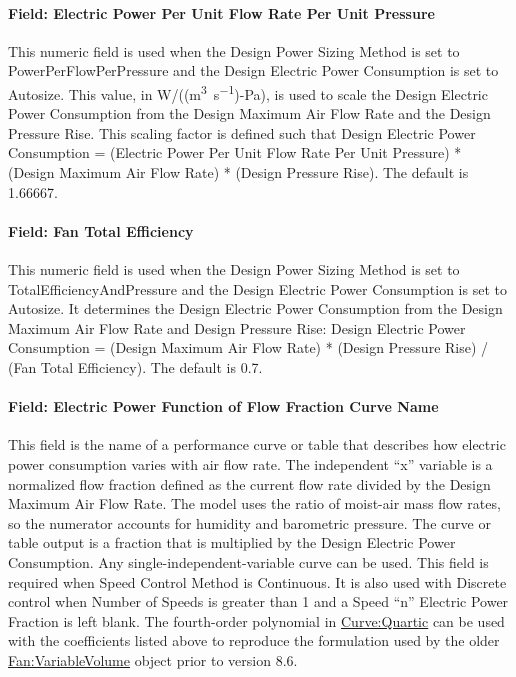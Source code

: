 \paragraph{Field: Electric Power Per Unit Flow Rate Per Unit Pressure}\label{field-power-per-flow-per-pressure-fansysmodel}

This numeric field is used when the Design Power Sizing Method is set to PowerPerFlowPerPressure and the Design Electric Power Consumption is set to Autosize. This value, in W/((\si{\m\cubed\per\s})-Pa), is used to scale the Design Electric Power Consumption from the Design Maximum Air Flow Rate and the Design Pressure Rise. This scaling factor is defined such that Design Electric Power Consumption = (Electric Power Per Unit Flow Rate Per Unit Pressure) * (Design Maximum Air Flow Rate) * (Design Pressure Rise).  The default is 1.66667.

\paragraph{Field: Fan Total Efficiency}\label{field-total-efficiency-fansysmodel}

This numeric field is used when the Design Power Sizing Method is set to TotalEfficiencyAndPressure and the Design Electric Power Consumption is set to Autosize. It determines the Design Electric Power Consumption from the Design Maximum Air Flow Rate and Design Pressure Rise: Design Electric Power Consumption = (Design Maximum Air Flow Rate) * (Design Pressure Rise) / (Fan Total Efficiency). The default is 0.7.

\paragraph{Field: Electric Power Function of Flow Fraction Curve Name}\label{field-power-curve-name-fansysmodel}

This field is the name of a performance curve or table that describes how electric power consumption varies with air flow rate. The independent ``x'' variable is a normalized flow fraction defined as the current flow rate divided by the Design Maximum Air Flow Rate. The model uses the ratio of moist-air mass flow rates, so the numerator accounts for humidity and barometric pressure. The curve or table output is a fraction that is multiplied by the Design Electric Power Consumption. Any single-independent-variable curve can be used. This field is required when Speed Control Method is Continuous. It is also used with Discrete control when Number of Speeds is greater than 1 and a Speed ``n'' Electric Power Fraction is left blank. The fourth-order polynomial in \hyperref[curvequartic]{Curve:Quartic} can be used with the coefficients listed above to reproduce the formulation used by the older \hyperref[fanvariablevolume]{Fan:VariableVolume} object prior to version 8.6.

